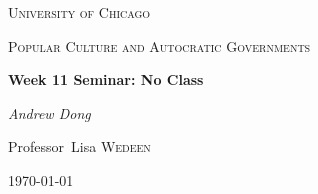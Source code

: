 \documentclass{article}
\begin{document}
\begin{titlepage}
	\centering
	{\scshape\LARGE University of Chicago \par}
	\vspace{1cm}
	{\scshape\Large Popular Culture and Autocratic Governments\par}
	\vspace{1.5cm}
	{\huge\bfseries Week 11 Seminar: No Class \par}
	\vspace{1cm}
	{\Large\itshape Andrew Dong\par}
	\vspace{2cm}
	
	\vfill


\begin{abstract}
Final Essays due.  You're done!
Lol no class.  
\end{abstract}

\vfill

	Professor~Lisa \textsc{Wedeen}
	\vspace{5 mm}
	\\{\large \today\par}
\end{titlepage}
\end{document}
